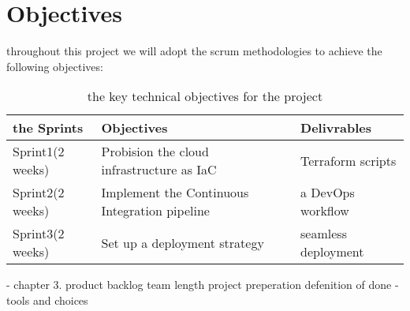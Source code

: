 \section{Objectives}
throughout  this project we will adopt the scrum methodologies to achieve the following objectives:
\begin{longtable}[c]{
    |p{}
    |p{}|
    p{}|
    }
    \caption{the key technical objectives for the project}
    \label{tab:objectivesTable}                      \\
    \hline

    the Sprints
     & Objectives
     & Delivrables                                   \\
    \hline

    Sprint1(2 weeks)
     & Probision the cloud infrastructure as IaC
     & Terraform scripts                             \\
    \hline

    Sprint2(2 weeks)
     & Implement the Continuous Integration pipeline
     & a DevOps workflow                             \\
    \hline

    Sprint3(2 weeks)
     & Set up a deployment strategy
     & seamless deployment                           \\
    \hline
\end{longtable}
- chapter 3.
product backlog team length 
project preperation  
defenition of done
- tools and choices